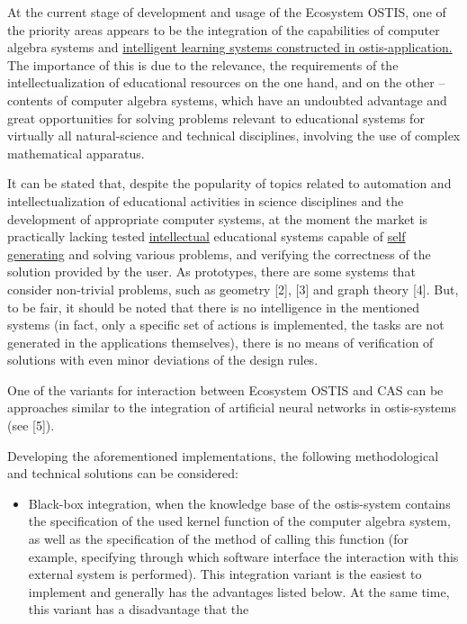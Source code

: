 \documentclass{article}
\begin{document}
\begin{multicols}{2}
\par At the current stage of development and usage of
the Ecosystem OSTIS, one of the priority areas appears to be the integration of the capabilities of computer algebra systems and \underline{intelligent learning systems
constructed in ostis-application.} The importance of this
is due to the relevance, the requirements of the intellectualization of educational resources on the one hand,
and on the other – contents of computer algebra systems,
which have an undoubted advantage and great opportunities for solving problems relevant to educational systems
for virtually all natural-science and technical disciplines,
involving the use of complex mathematical apparatus.
\par It can be stated that, despite the popularity of topics related to automation and intellectualization of educational
activities in science disciplines and the development of
appropriate computer systems, at the moment the market is practically lacking tested \underline{intellectual} educational
systems capable of \underline{self generating} and solving various
problems, and verifying the correctness of the solution
provided by the user. As prototypes, there are some
systems that consider non-trivial problems, such as geometry [2], [3] and graph theory [4]. But, to be fair,
it should be noted that there is no intelligence in the
mentioned systems (in fact, only a specific set of actions
is implemented, the tasks are not generated in the applications themselves), there is no means of verification of solutions with even minor deviations of the design rules.
\par One of the variants for interaction between Ecosystem OSTIS and CAS can be approaches similar to the
integration of artificial neural networks in ostis-systems
(see [5]).
\par Developing the aforementioned implementations, the
following methodological and technical solutions can be
considered:
\begin{itemize}
  \item Black-box integration, when the knowledge base
of the ostis-system contains the specification of
the used kernel function of the computer algebra
system, as well as the specification of the method
of calling this function (for example, specifying
through which software interface the interaction
with this external system is performed). This integration variant is the easiest to implement and
generally has the advantages listed below. At the
same time, this variant has a disadvantage that the

\end{itemize}
\end{multicols}
\end{document}
